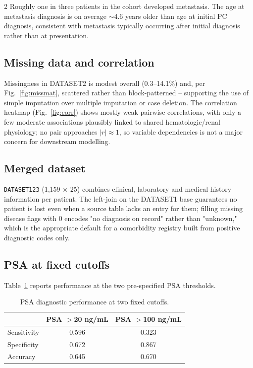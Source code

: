 ﻿\documentclass[a4paper,10pt]{article}
\begin{document}
\begin{multicols*}{2}
Roughly one in three patients in the cohort developed metastasis. The age at metastasis diagnosis is on average $\sim$4.6 years older than age at initial PC diagnosis, consistent with metastasis typically occurring after initial diagnosis rather than at presentation.

\subsection{Missing data and correlation}
Missingness in DATASET2 is modest overall (0.3--14.1\%) and, per Fig.~\ref{fig:missmat}, scattered rather than block-patterned -- supporting the use of simple imputation over multiple imputation or case deletion. The correlation heatmap (Fig.~\ref{fig:corr}) shows mostly weak pairwise correlations, with only a few moderate associations plausibly linked to shared hematologic/renal physiology; no pair approaches $|r|\approx1$, so variable dependencies is not a major concern for downstream modelling.

\subsection{Merged dataset}
\texttt{DATASET123} (1{,}159 $\times$ 25) combines clinical, laboratory and medical history information per patient. The left-join on the DATASET1 base guarantees no patient is lost even when a source table lacks an entry for them; filling missing disease flags with 0 encodes "no diagnosis on record" rather than "unknown," which is the appropriate default for a comorbidity registry built from positive diagnostic codes only.

\subsection{PSA at fixed cutoffs}
Table~\ref{tab:psa} reports performance at the two pre-specified PSA thresholds.

\begin{table}[H]
\centering
\caption{PSA diagnostic performance at two fixed cutoffs.}
\label{tab:psa}
\begin{tabular}{lcc}
\toprule
 & PSA $>$20 ng/mL & PSA $>$100 ng/mL \\
\midrule
Sensitivity & 0.596 & 0.323 \\
Specificity & 0.672 & 0.867 \\
Accuracy & 0.645 & 0.670 \\
\bottomrule
\end{tabular}
\end{table}


\end{multicols*}
\end{document}
